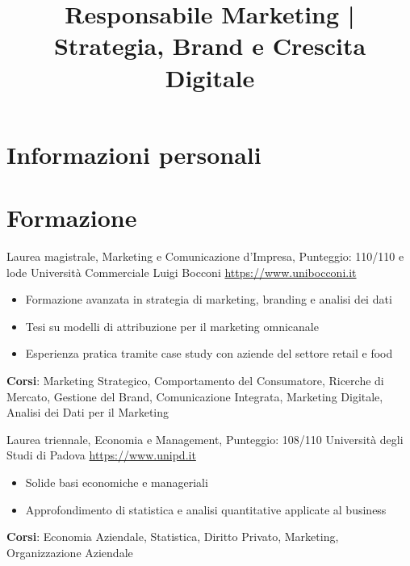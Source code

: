 \documentclass[a4paper, serif, 10pt]{moderncv}
\title{Responsabile Marketing | Strategia, Brand e Crescita Digitale}
\begin{document}
\maketitle

\section{Informazioni personali}

\section{Formazione}

        {Laurea magistrale, Marketing e Comunicazione d'Impresa, Punteggio: 110/110 e lode}
        {Università Commerciale Luigi Bocconi}
        {\url{https://www.unibocconi.it}}
        {}
        {\begin{itemize}
\item Formazione avanzata in strategia di marketing, branding e analisi dei dati
\item Tesi su modelli di attribuzione per il marketing omnicanale
\item Esperienza pratica tramite case study con aziende del settore retail e food
\end{itemize}
\textbf{Corsi}: Marketing Strategico, Comportamento del Consumatore, Ricerche di Mercato, Gestione del Brand, Comunicazione Integrata, Marketing Digitale, Analisi dei Dati per il Marketing}

        {Laurea triennale, Economia e Management, Punteggio: 108/110}
        {Università degli Studi di Padova}
        {\url{https://www.unipd.it}}
        {}
        {\begin{itemize}
\item Solide basi economiche e manageriali
\item Approfondimento di statistica e analisi quantitative applicate al business
\end{itemize}
\textbf{Corsi}: Economia Aziendale, Statistica, Diritto Privato, Marketing, Organizzazione Aziendale}
\end{document}
